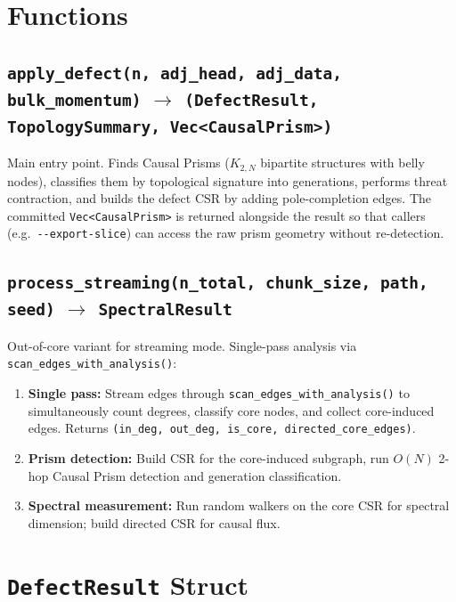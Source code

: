 \documentclass[11pt, a4paper, openany]{book}
\newcommand{\code}[1]{\texttt{#1}}
\newcommand{\func}[1]{\texttt{\color{structure}#1}}
\begin{document}
\section{Functions}

\subsection{\func{apply\_defect(n, adj\_head, adj\_data, bulk\_momentum)} $\to$ \code{(DefectResult, TopologySummary, Vec<CausalPrism>)}}

Main entry point.  Finds Causal Prisms ($K_{2,N}$ bipartite structures with
belly nodes), classifies them by topological signature into generations,
performs threat contraction, and builds the defect CSR by adding
pole-completion edges.  The committed \code{Vec<CausalPrism>} is returned
alongside the result so that callers (e.g.\ \code{-{}-export-slice}) can
access the raw prism geometry without re-detection.

\subsection{\func{process\_streaming(n\_total, chunk\_size, path, seed)} $\to$ \code{SpectralResult}}

Out-of-core variant for streaming mode.  Single-pass analysis via
\func{scan\_edges\_with\_analysis()}:
\begin{enumerate}
  \item \textbf{Single pass:} Stream edges through
        \func{scan\_edges\_with\_analysis()} to simultaneously count degrees,
        classify core nodes, and collect core-induced edges.  Returns
        \code{(in\_deg, out\_deg, is\_core, directed\_core\_edges)}.
  \item \textbf{Prism detection:} Build CSR for the core-induced subgraph, run
        $O(N)$ 2-hop Causal Prism detection and generation classification.
  \item \textbf{Spectral measurement:} Run random walkers on the core CSR for
        spectral dimension; build directed CSR for causal flux.
\end{enumerate}

\section{\code{DefectResult} Struct}
\end{document}
